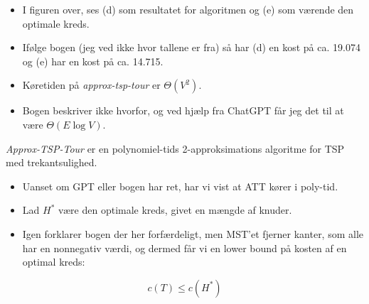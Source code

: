 \begin{frame}[allowframebreaks]
\begin{center}
	\end{center}
	\begin{itemize}
		\item I figuren over, ses (d) som resultatet for algoritmen og (e) som værende den optimale kreds.
		\item Ifølge bogen (jeg ved ikke hvor tallene er fra) så har (d) en kost på ca. 19.074 og (e) har en kost på ca. 14.715.
		\item Køretiden på \textit{approx-tsp-tour} er $\Theta(V^{2})$.
		\item Bogen beskriver ikke hvorfor, og ved hjælp fra ChatGPT får jeg det til at være $\Theta(E \log V)$.
	\end{itemize}

	\begin{theorem}
		\textit{Approx-TSP-Tour} er en polynomiel-tids 2-approksimations algoritme for TSP med trekantsulighed.
	\end{theorem}

	\begin{itemize}
		\item Uanset om GPT eller bogen har ret, har vi vist at ATT kører i poly-tid.
		\item Lad $H^{*}$ være den optimale kreds, givet en mængde af knuder.
		\item Igen forklarer bogen der her forfærdeligt, men MST'et fjerner kanter, som alle har en nonnegativ værdi, og dermed får vi en lower bound på kosten af en optimal kreds:
	\end{itemize}
	\begin{equation*}
		c(T) \le c(H^{*})
	\end{equation*}


\end{frame}
